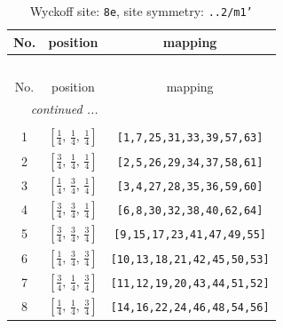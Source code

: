 \documentclass[fleqn,8pt]{jsarticle}
\begin{document}
\begin{longtable}{ccc}
\caption{Wyckoff site: {\tt 8e}, site symmetry: {\tt ..2/m1'}}
 \\
 \hline \hline
No. & position & mapping \\ \hline \endfirsthead

\multicolumn{2}{l}{\tablename\ \thetable{}} \\
 \hline \hline
No. & position & mapping \\ \hline \endhead

 \hline \hline
\multicolumn{2}{r}{\footnotesize\it continued ...} \\ \endfoot

 \hline \hline
\multicolumn{2}{r}{} \\ \endlastfoot

1 & $\left[ \frac{1}{4},\, \frac{1}{4},\, \frac{1}{4} \right]$ & {\tt [1,7,25,31,33,39,57,63]} \\ \hline
2 & $\left[ \frac{3}{4},\, \frac{1}{4},\, \frac{1}{4} \right]$ & {\tt [2,5,26,29,34,37,58,61]} \\ \hline
3 & $\left[ \frac{1}{4},\, \frac{3}{4},\, \frac{1}{4} \right]$ & {\tt [3,4,27,28,35,36,59,60]} \\ \hline
4 & $\left[ \frac{3}{4},\, \frac{3}{4},\, \frac{1}{4} \right]$ & {\tt [6,8,30,32,38,40,62,64]} \\ \hline
5 & $\left[ \frac{3}{4},\, \frac{3}{4},\, \frac{3}{4} \right]$ & {\tt [9,15,17,23,41,47,49,55]} \\ \hline
6 & $\left[ \frac{1}{4},\, \frac{3}{4},\, \frac{3}{4} \right]$ & {\tt [10,13,18,21,42,45,50,53]} \\ \hline
7 & $\left[ \frac{3}{4},\, \frac{1}{4},\, \frac{3}{4} \right]$ & {\tt [11,12,19,20,43,44,51,52]} \\ \hline
8 & $\left[ \frac{1}{4},\, \frac{1}{4},\, \frac{3}{4} \right]$ & {\tt [14,16,22,24,46,48,54,56]} \\
\end{longtable}
\renewcommand{\arraystretch}{1.2}
\end{document}
